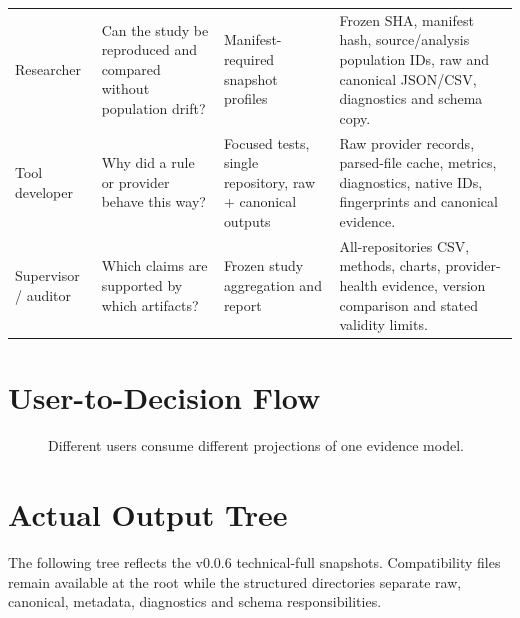 \begin{longtable}{p{3.1cm}p{3.5cm}p{3.2cm}p{4.5cm}}
Researcher & Can the study be reproduced and compared without population
drift? & Manifest-required snapshot profiles & Frozen SHA, manifest hash,
source/analysis population IDs, raw and canonical JSON/CSV, diagnostics and
schema copy. \\
Tool developer & Why did a rule or provider behave this way? & Focused tests,
single repository, raw + canonical outputs & Raw provider records, parsed-file
cache, metrics, diagnostics, native IDs, fingerprints and canonical evidence. \\
Supervisor / auditor & Which claims are supported by which artifacts? & Frozen
study aggregation and report & All-repositories CSV, methods, charts,
provider-health evidence, version comparison and stated validity limits. \\
\bottomrule
\end{longtable}

\section{User-to-Decision Flow}
\begin{figure}[H]
\centering
{}
\caption{Different users consume different projections of one evidence model.}
\end{figure}

\section{Actual Output Tree}
The following tree reflects the v0.0.6 technical-full snapshots. Compatibility
files remain available at the root while the structured directories separate
raw, canonical, metadata, diagnostics and schema responsibilities.

